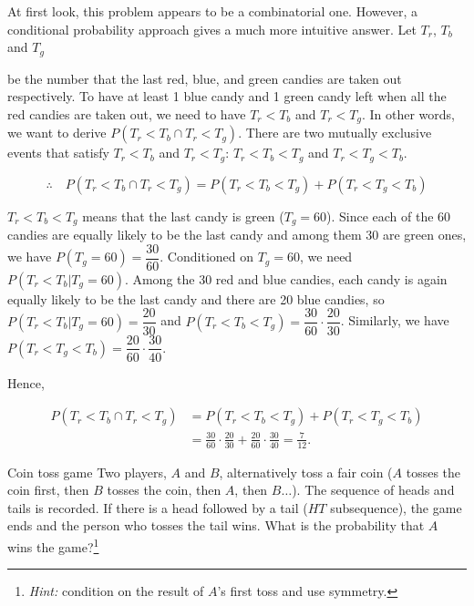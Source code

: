 \begin{solution}
At first look, this problem appears to be a combinatorial one. However, a conditional
probability approach gives a much more intuitive answer. Let $T_r$, $T_b$ and $T_g$

be the number that the last red, blue, and green candies are taken out respectively. To
have at least 1 blue candy and 1 green candy left when all the red candies are taken out,
we need to have $T_r<T_b$ and $T_r<T_g$. In other words, we want to derive
$P(T_r<T_b\cap T_r<T_g)$. There are two mutually exclusive events that satisfy $T_r<T_b$ and
$T_r<T_g$: $T_r<T_b<T_g$ and $T_r<T_g<T_b$.

\[
\therefore\quad P(T_r<T_b\cap T_r<T_g)=P(T_r<T_b<T_g)+P(T_r<T_g<T_b)
\]

$T_r<T_b<T_g$ means that the last candy is green ($T_g=60$). Since each of the 60 candies
are equally likely to be the last candy and among them 30 are green ones, we have
$P(T_g=60)=\dfrac{30}{60}$. Conditioned on $T_g=60$, we need $P(T_r<T_b\vert T_g=60)$. Among the 30
red and blue candies, each candy is again equally likely to be the last candy and there are
20 blue candies, so $P(T_r<T_b\vert T_g=60)=\dfrac{20}{30}$ and $P(T_r<T_b<T_g)=\dfrac{30}{60}\cdot\dfrac{20}{30}$. Similarly,
we have $P(T_r<T_g<T_b)=\dfrac{20}{60}\cdot\dfrac{30}{40}$.

Hence,

\[
\begin{aligned}
P(T_r<T_b\cap T_r<T_g)&=P(T_r<T_b<T_g)+P(T_r<T_g<T_b)\\
&=\frac{30}{60}\cdot\frac{20}{30}+\frac{20}{60}\cdot\frac{30}{40}=\frac{7}{12}.
\end{aligned}
\]

\end{solution}

\begin{problem}{Coin toss game}
Two players, $A$ and $B$, alternatively toss a fair coin ($A$ tosses the coin first, then $B$ tosses
the coin, then $A$, then $B\ldots$). The sequence of heads and tails is recorded. If there is a
head followed by a tail ($HT$ subsequence), the game ends and the person who tosses the
tail wins. What is the probability that $A$ wins the game?\footnote[17]{\emph{Hint:} condition on the result of $A$'s first toss and use symmetry.}
\end{problem}

